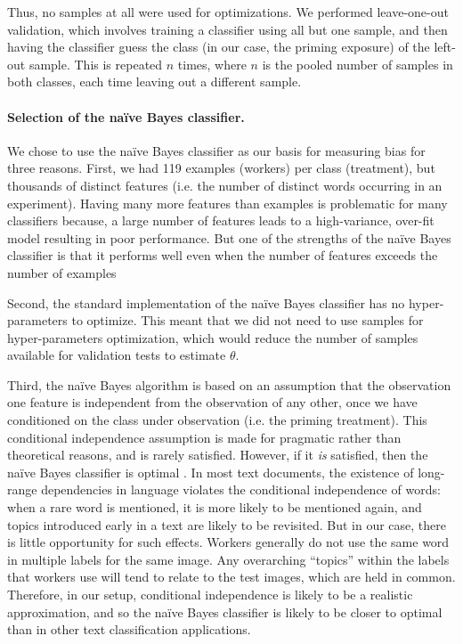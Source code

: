 \documentclass[12pt]{article}
\begin{document}
	Thus, no samples at all were used for optimizations.  We performed 
	leave-one-out validation, which involves training a classifier using 
	all but one sample, and then having the classifier guess the class
	(in our case, the priming exposure) of the left-out sample.  This is 
	repeated $n$ times, where $n$ is the pooled number of samples in both
	classes, each time leaving out a different sample.

\paragraph{Selection of the na\"ive Bayes classifier.}
We chose to use the na\"ive Bayes classifier as our basis for measuring 
bias for three reasons.  First, we had 119 examples (workers) per class 
(treatment), but thousands of distinct features 
(i.e. the number of distinct words occurring in an experiment).  
Having many more features than examples is problematic for many classifiers
because, a large number of features leads to a high-variance, over-fit model
resulting in poor performance.  But one of the strengths of the na\"ive 
Bayes classifier is that it performs well even when the number of features
exceeds the number of examples\cite{bickel2004, hastie2009elements}

Second, the standard implementation of the na\"ive Bayes classifier has no 
hyper-parameters to optimize. This meant that we did not need to use 
samples for hyper-parameters optimization, which would reduce the number
of samples available for validation tests to estimate $\theta$.

Third, the na\"ive Bayes algorithm is based on an assumption that the 
observation one feature is independent from the observation of any 
other, once we have conditioned on the class under observation 
\cite{bishop2006} (i.e. the priming treatment).  This
conditional independence assumption is made for
pragmatic rather than theoretical reasons, and is rarely satisfied.  However,
if it \textit{is} satisfied, then the na\"ive Bayes classifier is 
optimal \cite{Zhang2004562}.  In most text documents, 
the existence of long-range dependencies in language 
violates the conditional independence of words: when a rare word is mentioned,
it is more likely to be mentioned again, and topics introduced early in a
text are likely to be revisited.
But in our case, there is little opportunity for such effects.  Workers 
generally do not use the same word in multiple labels for the same image. 
Any overarching ``topics'' within the labels that workers use will tend to 
relate to the test images, which are held in common.
Therefore, in our setup, conditional independence is likely to be 
a realistic approximation, and so the na\"ive Bayes classifier is likely to
be closer to optimal than in other text classification applications.
\end{document}
